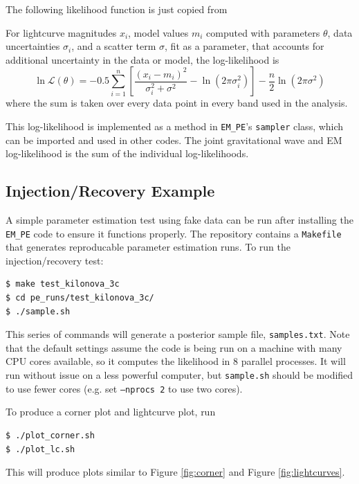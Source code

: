 \documentclass{article}
\newcommand\editremark[1]{{\color{red}#1}}
\begin{document}
\editremark{The following likelihood function is just copied from \cite{Villar_2017}}

For lightcurve magnitudes $x_i$, model values $m_i$ computed with parameters $\theta$, data uncertainties $\sigma_i$, and a scatter term $\sigma$, fit as a parameter, that accounts for additional uncertainty in the data or model, the log-likelihood is
\begin{equation}
    \ln \mathcal{L}(\theta) = -0.5 \sum_{i=1}^n \left [ \frac {(x_i - m_i)^2} {\sigma_i^2 + \sigma^2} - \ln(2 \pi \sigma_i^2) \right ] - \frac {n} {2} \ln(2 \pi \sigma^2)
\end{equation}
where the sum is taken over every data point in every band used in the analysis.

This log-likelihood is implemented as a method in \texttt{EM\_PE}'s \texttt{sampler} class, which can be imported and used in other codes.
The joint gravitational wave and EM log-likelihood is the sum of the individual log-likelihoods.

\subsection{Injection/Recovery Example}

A simple parameter estimation test using fake data can be run after installing the \texttt{EM\_PE} code to ensure it functions properly.
The repository contains a \texttt{Makefile} that generates reproducable parameter estimation runs.
To run the injection/recovery test:
\begin{verbatim}
$ make test_kilonova_3c
$ cd pe_runs/test_kilonova_3c/
$ ./sample.sh
\end{verbatim}
This series of commands will generate a posterior sample file, \texttt{samples.txt}.
Note that the default settings assume the code is being run on a machine with many CPU cores available, so it computes the likelihood in 8 parallel processes.
It will run without issue on a less powerful computer, but \texttt{sample.sh} should be modified to use fewer cores (e.g. set \texttt{--nprocs 2} to use two cores).

To produce a corner plot and lightcurve plot, run
\begin{verbatim}
$ ./plot_corner.sh
$ ./plot_lc.sh
\end{verbatim}
This will produce plots similar to Figure \ref{fig:corner} and Figure \ref{fig:lightcurves}.
\end{document}
